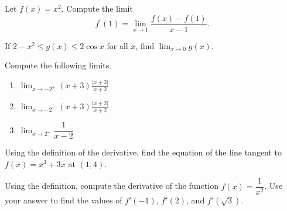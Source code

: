 \documentclass[10pt]{amsart}
\begin{document}
\vspace{4in}

\begin{thm}
  Let \(f(x) = x^2\).
  Compute the limit
  \[f^\prime(1) = \lim_{x \to 1}\frac{f(x)-f(1)}{x - 1}.\]
\end{thm}

\vspace{2in}

\begin{thm}
  If \(2-x^2\leq g(x)\leq 2\cos x\) for all \(x\), find \(\lim_{x\rightarrow 0}g(x)\).
\end{thm}

\newpage

\begin{thm}
  Compute the following limits.
  \begin{multicols}{3}
    \begin{enumerate}
    \item
      \(\displaystyle{\lim_{x\rightarrow -2^+}(x+3)\frac{\vert x+2\vert}{x+2}}\)
    \item
      \(\displaystyle{\lim_{x\rightarrow -2^-}(x+3)\frac{\vert x+2\vert}{x+2}}\)
    \item
      \(\displaystyle{\lim_{x\rightarrow 2^+}\dfrac{1}{x-2}}\)
    \end{enumerate}
  \end{multicols}
\end{thm}

\vspace{4in}

\begin{thm}
  Using the definition of the derivative, find the equation of the line tangent to \(f(x)=x^3+3x\) at \((1,4)\).
\end{thm}

\newpage

\begin{thm}
  Using the definition, compute the derivative of the function \(f(x) = \dfrac{1}{x^2}\).
  Use your answer to find the values of $f'(-1)$, $f'(2)$, and $f'(\sqrt{3})$.
\end{thm}
\end{document}
